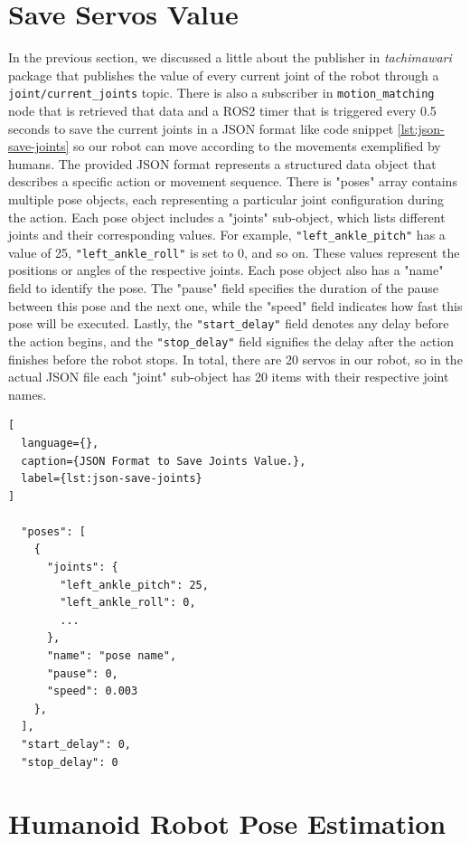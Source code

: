 \section{Save Servos Value}
\label{sec:save-servo-value}

In the previous section, we discussed a little about the publisher in \emph{tachimawari} package that publishes the value of every current joint of the robot through a \verb|joint/current_joints| topic.
There is also a subscriber in \verb|motion_matching| node that is retrieved that data and a ROS2 timer that is triggered every 0.5 seconds to save the current joints in a JSON format like code snippet \ref{lst:json-save-joints} so our robot can move according to the movements exemplified by humans. 
The provided JSON format represents a structured data object that describes a specific action or movement sequence. There is "poses" array contains multiple pose objects, each representing a particular joint configuration during the action.
Each pose object includes a "joints" sub-object, which lists different joints and their corresponding values. For example, \verb|"left_ankle_pitch"| has a value of 25, \verb|"left_ankle_roll"| is set to 0, and so on. These values represent the positions or angles of the respective joints.
Each pose object also has a "name" field to identify the pose. The "pause" field specifies the duration of the pause between this pose and the next one, while the "speed" field indicates how fast this pose will be executed.
Lastly, the \verb|"start_delay"| field denotes any delay before the action begins, and the \verb|"stop_delay"| field signifies the delay after the action finishes before the robot stops. In total, there are 20 servos in our robot, so in the actual JSON file each "joint" sub-object has 20 items with their respective joint names.

\begin{lstlisting}[
  language={},
  caption={JSON Format to Save Joints Value.},
  label={lst:json-save-joints}
]

  "poses": [
    {
      "joints": {
        "left_ankle_pitch": 25,
        "left_ankle_roll": 0,
        ...
      },
      "name": "pose name",
      "pause": 0,
      "speed": 0.003
    },
  ],
  "start_delay": 0,
  "stop_delay": 0

\end{lstlisting}


\section{Humanoid Robot Pose Estimation}
\label{sec:humanoid-robot-pose-estimation}

